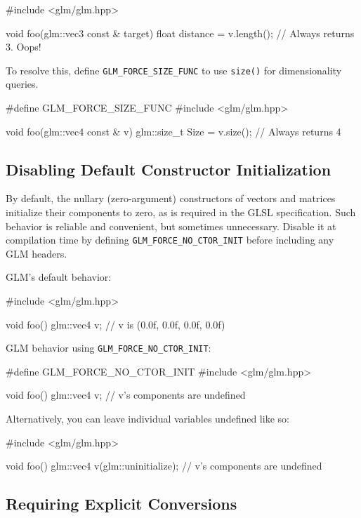 \documentclass{scrartcl}
\numberwithin{figure}{subsection}
\begin{document}
\begin{cppcode}
#include <glm/glm.hpp>

void foo(glm::vec3 const & target)
{
  float distance = v.length();  // Always returns 3.  Oops!
}
\end{cppcode}

To resolve this, define \verb|GLM_FORCE_SIZE_FUNC| to use \verb|size()| for dimensionality queries.

\begin{cppcode}
#define GLM_FORCE_SIZE_FUNC 
#include <glm/glm.hpp>

void foo(glm::vec4 const & v)
{
  glm::size_t Size = v.size();  // Always returns 4
}
\end{cppcode}


\subsection{Disabling Default Constructor Initialization}

By default, the nullary (zero-argument) constructors of vectors and matrices initialize their components to zero, as is required in the GLSL specification.  Such behavior is reliable and convenient, but sometimes unnecessary.  Disable it at compilation time by defining \verb|GLM_FORCE_NO_CTOR_INIT| before including any GLM headers.

GLM's default behavior:

\begin{cppcode}
#include <glm/glm.hpp>

void foo()
{
  glm::vec4 v; // v is (0.0f, 0.0f, 0.0f, 0.0f)
}
\end{cppcode}

GLM behavior using \verb|GLM_FORCE_NO_CTOR_INIT|:

\begin{cppcode}
#define GLM_FORCE_NO_CTOR_INIT 
#include <glm/glm.hpp>

void foo()
{
  glm::vec4 v; // v's components are undefined
}
\end{cppcode}

Alternatively, you can leave individual variables undefined like so:

\begin{cppcode}
#include <glm/glm.hpp>

void foo()
{
  glm::vec4 v(glm::uninitialize); // v's components are undefined
}
\end{cppcode}

\subsection{Requiring Explicit Conversions}
\end{document}
